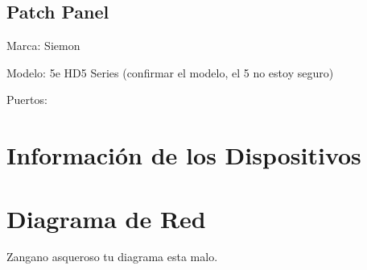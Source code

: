 \documentclass[spanish]{udpreport}
\begin{document}
\section{Patch Panel}
Marca: Siemon

Modelo: 5e HD5 Series (confirmar el modelo, el 5 no estoy seguro)

Puertos:

\chapter{Información de los Dispositivos}

\chapter{Diagrama de Red}
Zangano asqueroso tu diagrama esta malo.

\listoffigures
\end{document}
